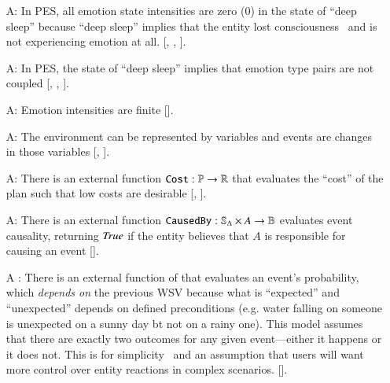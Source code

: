 \begin{itemize}
    \item[A\refstepcounter{assumpnum}\theassumpnum \label{A_PositiveIntensity}:]
    In PES, all emotion state intensities are zero (0) in the state of ``deep
    sleep'' because ``deep sleep'' implies that the entity lost
    consciousness~\citep[p.~1--2]{mondino2021definitions} and is not
    experiencing emotion at all. [,
    , ].

    \item[A\refstepcounter{assumpnum}\theassumpnum \label{A_EmotionPairs}:] In
    PES, the state of ``deep sleep'' implies that emotion type pairs are not
    coupled [, ,
    ].

    \item[A\refstepcounter{assumpnum}\theassumpnum \label{A_LimitIntensity}:]
    Emotion intensities are finite [].

    \item[A\refstepcounter{assumpnum}\theassumpnum \label{A_Events}:]
    The environment can be represented by variables and events are changes in
    those variables [, ].

    \item[A\refstepcounter{assumpnum}\theassumpnum \label{A_CostFunction}:]
    There is an external function $\mathtt{Cost} : \mathbb{P} \rightarrow
    \mathbb{R}$ that evaluates the ``cost'' of the plan such that low costs are
    desirable [, ].

    \item[A\refstepcounter{assumpnum}\theassumpnum \label{A_CausedByFunction}:]
    There is an external function $\mathtt{CausedBy} : \mathbb{S}_{\Delta}
    \times A \rightarrow \mathbb{B}$ evaluates event causality, returning
    $\mathit{True}$ if the entity believes that $A$ is responsible for causing an event
    [].

    \item[A\refstepcounter{assumpnum}\theassumpnum
    \label{A_EventProbabilityFunction}:]
    There is an external function of that evaluates an event's probability,
    which \textit{depends on} the previous WSV because what is ``expected'' and
    ``unexpected'' depends on defined preconditions (e.g. water falling on
    someone is unexpected on a sunny day bt not on a rainy one). This model
    assumes that there are exactly two outcomes for any given event---either it
    happens or it does not. This is for
    simplicity~\citep[p.~56]{reisenzein2019cognitive} and an assumption that
    users will want more control over entity reactions in complex scenarios.
    [].


\end{itemize}
